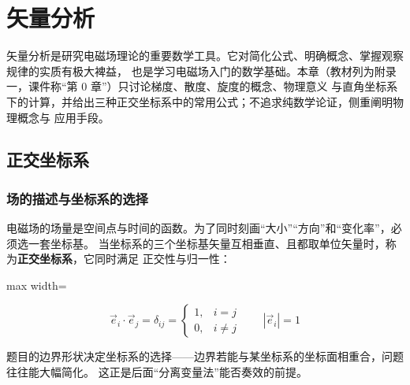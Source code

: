 %
\newenvironment{formulaBox}{%
    \par\begin{adjustbox}{max width=\linewidth}%
    \begin{tcolorbox}[colback=blue!8!white,colframe=transparent,boxrule=0pt,halign=center,boxsep=2pt,left=4pt,right=4pt,top=3pt,bottom=3pt]%
}{%
    \end{tcolorbox}\end{adjustbox}\par
}

\chapter{矢量分析}

矢量分析是研究电磁场理论的重要数学工具。它对简化公式、明确概念、掌握观察规律的实质有极大裨益，
也是学习电磁场入门的数学基础。本章（教材列为附录一，课件称“第 0 章”）只讨论梯度、散度、旋度的概念、物理意义
与直角坐标系下的计算，并给出三种正交坐标系中的常用公式；不追求纯数学论证，侧重阐明物理概念与
应用手段。

\section{正交坐标系}

\subsection{场的描述与坐标系的选择}

电磁场的场量是空间点与时间的函数。为了同时刻画“大小”“方向”和“变化率”，必须选一套坐标基。
当坐标系的三个坐标基矢量互相垂直、且都取单位矢量时，称为\textbf{正交坐标系}，它同时满足
正交性与归一性：
\begin{formulaBox}
\[
\vec{e}_i\cdot\vec{e}_j=\delta_{ij}=
\begin{cases}1, & i=j\\ 0, & i\neq j\end{cases}
\qquad |\vec{e}_i|=1
\]
\end{formulaBox}

题目的边界形状决定坐标系的选择——边界若能与某坐标系的坐标面相重合，问题往往能大幅简化。
这正是后面“分离变量法”能否奏效的前提。


